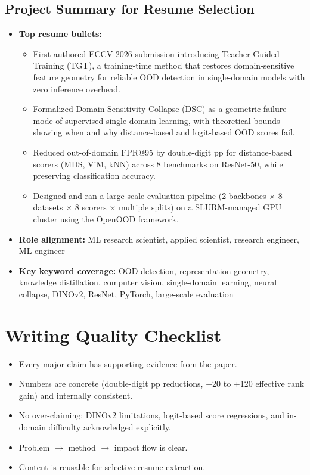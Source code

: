 \documentclass{article}
\begin{document}
\subsection{Project Summary for Resume Selection}
\begin{itemize}
    \item \textbf{Top resume bullets:}
    \begin{itemize}
        \item First-authored ECCV 2026 submission introducing Teacher-Guided Training (TGT), a training-time method that restores domain-sensitive feature geometry for reliable OOD detection in single-domain models with zero inference overhead.
        \item Formalized Domain-Sensitivity Collapse (DSC) as a geometric failure mode of supervised single-domain learning, with theoretical bounds showing when and why distance-based and logit-based OOD scores fail.
        \item Reduced out-of-domain FPR@95 by double-digit pp for distance-based scorers (MDS, ViM, kNN) across 8 benchmarks on ResNet-50, while preserving classification accuracy.
        \item Designed and ran a large-scale evaluation pipeline (2 backbones $\times$ 8 datasets $\times$ 8 scorers $\times$ multiple splits) on a SLURM-managed GPU cluster using the OpenOOD framework.
    \end{itemize}
    \item \textbf{Role alignment:} ML research scientist, applied scientist, research engineer, ML engineer
    \item \textbf{Key keyword coverage:} OOD detection, representation geometry, knowledge distillation, computer vision, single-domain learning, neural collapse, DINOv2, ResNet, PyTorch, large-scale evaluation
\end{itemize}

\section{Writing Quality Checklist}
\begin{itemize}
    \item[$\checkmark$] Every major claim has supporting evidence from the paper.
    \item[$\checkmark$] Numbers are concrete (double-digit pp reductions, +20 to +120 effective rank gain) and internally consistent.
    \item[$\checkmark$] No over-claiming; DINOv2 limitations, logit-based score regressions, and in-domain difficulty acknowledged explicitly.
    \item[$\checkmark$] Problem $\rightarrow$ method $\rightarrow$ impact flow is clear.
    \item[$\checkmark$] Content is reusable for selective resume extraction.
\end{itemize}
\end{document}

